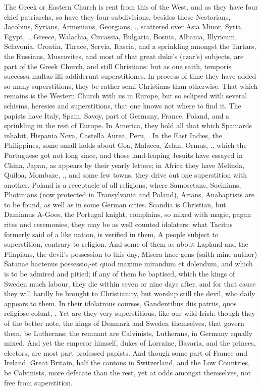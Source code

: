 {The Greek or Eastern Church is rent from this of the West, and as
they have four chief patriarchs, so have they four subdivisions,
besides those Nestorians, Jacobins, Syrians, Armenians, Georgians, \etc{}.,
scattered over Asia Minor, Syria, Egypt, \etc{}., Greece, Walachia,
Circassia, Bulgaria, Bosnia, Albania, Illyricum, Sclavonia, Croatia,
Thrace, Servia, Rascia, and a sprinkling amongst the Tartars, the
Russians, Muscovites, and most of that great duke's (czar's) subjects,
are part of the Greek Church, and still Christians: but as one
saith, temporis successu multas illi addiderunt superstitiones. In
process of time they have added so many superstitions, they be rather
semi-Christians than otherwise. That which remains is the Western
Church with us in Europe, but so eclipsed with several schisms,
heresies and superstitions, that one knows not where to find it. The
papists have Italy, Spain, Savoy, part of Germany, France, Poland, and
a sprinkling in the rest of Europe. In America, they hold all that
which Spaniards inhabit, Hispania Nova, Castella Aurea, Peru, \etc{}. In
the East Indies, the Philippines, some small holds about Goa, Malacca,
Zelan, Ormus, \etc{}., which the Portuguese got not long since, and those
land-leaping Jesuits have essayed in China, Japan, as appears by their
yearly letters; in Africa they have Melinda, Quiloa, Mombaze, \etc{}., and
some few towns, they drive out one superstition with another. Poland is
a receptacle of all religions, where Samosetans, Socinians, Photinians
(now protected in Transylvania and Poland), Arians, Anabaptists are to
be found, as well as in some German cities. Scandia is Christian, but
Damianus A-Goes, the Portugal knight, complains, so mixed with
magic, pagan rites and ceremonies, they may be as well counted
idolaters: what Tacitus formerly said of a like nation, is verified in
them, A people subject to superstition, contrary to religion. And
some of them as about Lapland and the Pilapians, the devil's possession
to this day, Misera haec gens (saith mine author) Satanae
hactenus possessio,-et quod maxime mirandum et dolendum, and which is
to be admired and pitied; if any of them be baptised, which the kings
of Sweden much labour, they die within seven or nine days after, and
for that cause they will hardly be brought to Christianity, but worship
still the devil, who daily appears to them. In their idolatrous
courses, Gandentibus diis patriis, quos religiose colunt, \etc{}. Yet are
they very superstitious, like our wild Irish: though they of the better
note, the kings of Denmark and Sweden themselves, that govern them, be
Lutherans; the remnant are Calvinists, Lutherans, in Germany equally
mixed. And yet the emperor himself, dukes of Lorraine, Bavaria, and the
princes, electors, are most part professed papists. And though some
part of France and Ireland, Great Britain, half the cantons in
Switzerland, and the Low Countries, be Calvinists, more defecate than
the rest, yet at odds amongst themselves, not free from superstition.

}
